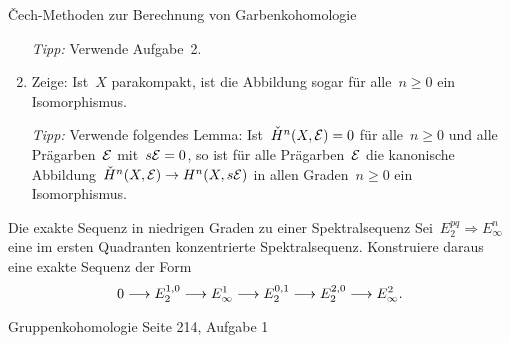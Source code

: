 \documentclass{uebblatt}
\begin{document}
\begin{aufgabe}{Čech-Methoden zur Berechnung von Garbenkohomologie}
\begin{enumerate}
{\tiny\emph{Tipp:} Verwende Aufgabe~2.\par}
\item Zeige: Ist~$X$ parakompakt, ist die Abbildung sogar für alle~$n \geq 0$ ein
Isomorphismus.

{\tiny\emph{Tipp:} Verwende folgendes Lemma: Ist~$\check H^n(X,\mathcal{E}) = 0$ für
alle~$n \geq 0$ und alle Prägarben~$\mathcal{E}$ mit~$s\mathcal{E} = 0$, so ist für alle
Prägarben~$\mathcal{E}$ die kanonische Abbildung~$\check H^n(X,\mathcal{E}) \to H^n(X,s\mathcal{E})$ in
allen Graden~$n \geq 0$ ein Isomorphismus.\par}
\end{enumerate}
\end{aufgabe}

\begin{aufgabe}{Die exakte Sequenz in niedrigen Graden zu einer
Spektralsequenz}
Sei~$E_2^{pq} \Rightarrow E_\infty^n$ eine im ersten Quadranten konzentrierte
Spektralsequenz. Konstruiere daraus eine exakte Sequenz der Form
\[ 0 \longrightarrow E_2^{1,0} \longrightarrow E^1_\infty \longrightarrow E_2^{0,1} \longrightarrow E_2^{2,0} \longrightarrow
E^2_\infty. \]
\end{aufgabe}

\begin{aufgabe}{Gruppenkohomologie}
Seite 214, Aufgabe 1
\end{aufgabe}
\end{document}
